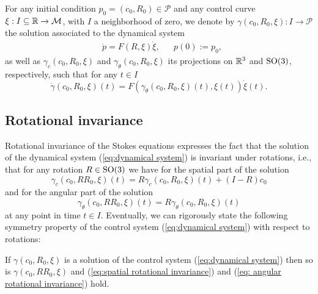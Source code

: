\label{sec: symmetries}
For any initial condition $p_0 = (c_0, R_0) \in \mathcal{P}$ and any control curve $\xi: I \subseteq \mathbb{R} \to \mathcal{M}$, with $I$ a neighborhood of zero, we denote by $\gamma(c_0, R_0, \xi): I \to \mathcal{P}$ the solution associated to the dynamical system
\begin{equation}
\label{eq:dynamical system}
\begin{aligned}
	&\dot{p} = F(R, \xi) \dot{\xi},& & p(0) := p_0,
\end{aligned}
\end{equation}
as well as $\gamma_c(c_0, R_0, \xi)$ and $\gamma_\theta(c_0, R_0, \xi)$ its projections on $\mathbb{R}^3$ and $\operatorname{SO}(3)$, respectively, such that for any $t \in I$
\begin{equation}
	\dot{\gamma}(c_0, R_0, \xi)(t) = F(\gamma_\theta(c_0, R_0, \xi)(t), \xi(t))\dot{\xi}(t).
\end{equation}

\subsection{Rotational invariance}
Rotational invariance of the Stokes equations expresses the fact that the solution of the dynamical system (\ref{eq:dynamical system}) is invariant under rotations, i.e., that for any rotation $R \in \operatorname{SO}(3)$ we have for the spatial part of the solution
\begin{equation}
\label{eq:spatial rotational invariance}
	\gamma_c(c_0, R R_0, \xi)(t) = R \gamma_c (c_0, R_0, \xi)(t) + (I - R) c_0
\end{equation}
and for the angular part of the solution
\begin{equation}
\label{eq: angular rotational invariance}
	\gamma_\theta(c_0, R R_0, \xi)(t) =  R \gamma_\theta(c_0, R_0, \xi)(t)
\end{equation}
at any point in time $t \in I$. Eventually, we can rigorously state the following symmetry property of the control system (\ref{eq:dynamical system}) with respect to rotations:

\begin{condition}
\label{cond:rotational invariance}
If $\gamma(c_0, R_0, \xi)$ is a solution of the control system (\ref{eq:dynamical system}) then so is $\gamma(c_0, R R_0, \xi)$ and (\ref{eq:spatial rotational invariance}) and (\ref{eq: angular rotational invariance}) hold.
\end{condition}

